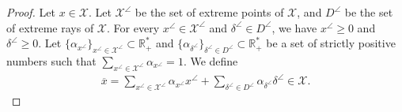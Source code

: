 \documentclass[11pt]{article}
\theoremstyle{plain}
\theoremstyle{definition}
\newcommand{\R}[0]{\mathbb R}
\newcommand{\cX}{\mathcal{X}}
\begin{document}
\begin{proof}
            Let $x\in \cX$. Let $\cX^\angle$ be the set of extreme points of $\cX$, and $D^\angle$ be the set of extreme rays of $\cX$. For every $x^\angle \in \cX^\angle$ and $\delta^\angle \in D^\angle$, we have $x^\angle \geq 0$ and $\delta^\angle \geq 0$. Let $\{\alpha_{x^\angle}\}_{x^\angle \in \cX^\angle}\subset \R^*_+$ and $\{\alpha_{\delta^\angle}\}_{\delta^\angle \in D^\angle}\subset \R^*_+$ be a set of strictly positive numbers such that $\sum_{x^\angle \in \cX^\angle}^{}\alpha_{x^\angle}=1$. We define 
            \begin{align*}
                \overline{x}=\sum_{x^\angle \in \cX^\angle}^{}\alpha_{x^\angle}x^\angle + \sum_{\delta^\angle \in D^\angle}^{}\alpha_{\delta^\angle}\delta^\angle\in \cX.
            \end{align*}


\end{proof}
\end{document}
